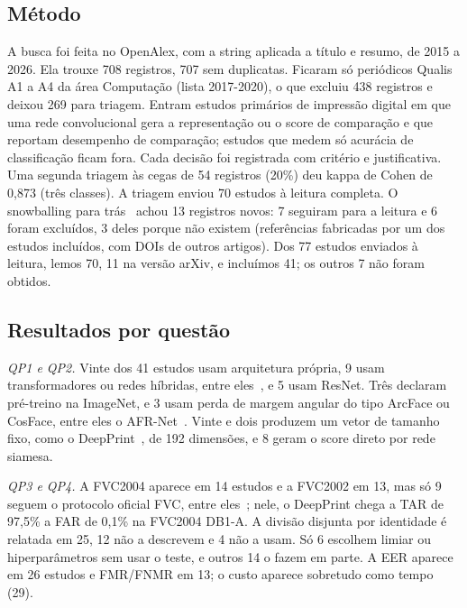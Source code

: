 \documentclass[conference]{IEEEtran}
\newcommand{\mapRegistros}{708}
\newcommand{\mapUnicos}{707}
\newcommand{\mapQualis}{438}
\newcommand{\mapTriagem}{269}
\newcommand{\mapTexto}{70}
\newcommand{\mapLidos}{70}
\newcommand{\mapIncl}{41}
\newcommand{\mapPend}{7}
\begin{document}
\subsection{Método}

A busca foi feita no OpenAlex, com a string aplicada a título e resumo, de 2015 a 2026. Ela trouxe \mapRegistros{} registros, \mapUnicos{} sem duplicatas. Ficaram só periódicos Qualis A1 a A4 da área Computação (lista 2017-2020), o que excluiu \mapQualis{} registros e deixou \mapTriagem{} para triagem. Entram estudos primários de impressão digital em que uma rede convolucional gera a representação ou o score de comparação e que reportam desempenho de comparação; estudos que medem só acurácia de classificação ficam fora. Cada decisão foi registrada com critério e justificativa. Uma segunda triagem às cegas de 54 registros (20\%) deu kappa de Cohen de 0,873 (três classes). A triagem enviou \mapTexto{} estudos à leitura completa. O snowballing para trás~\cite{wohlin2014snowballing} achou 13 registros novos: 7 seguiram para a leitura e 6 foram excluídos, 3 deles porque não existem (referências fabricadas por um dos estudos incluídos, com DOIs de outros artigos). Dos 77 estudos enviados à leitura, lemos \mapLidos{}, 11 na versão arXiv, e incluímos \mapIncl{}; os outros \mapPend{} não foram obtidos.

\subsection{Resultados por questão}

\emph{QP1 e QP2.} Vinte dos \mapIncl{} estudos usam arquitetura própria, 9 usam transformadores ou redes híbridas, entre eles~\cite{qiu2024ifvit,grosz2024afrnet,guan2024jipnet}, e 5 usam ResNet. Três declaram pré-treino na ImageNet, e 3 usam perda de margem angular do tipo ArcFace ou CosFace, entre eles o AFR-Net~\cite{grosz2024afrnet}. Vinte e dois produzem um vetor de tamanho fixo, como o DeepPrint~\cite{engelsma2021deepprint}, de 192 dimensões, e 8 geram o score direto por rede siamesa.

\emph{QP3 e QP4.} A FVC2004 aparece em 14 estudos e a FVC2002 em 13, mas só 9 seguem o protocolo oficial FVC, entre eles~\cite{engelsma2021deepprint,qiu2024ifvit,grosz2024afrnet}; nele, o DeepPrint chega a TAR de 97,5\% a FAR de 0,1\% na FVC2004 DB1-A. A divisão disjunta por identidade é relatada em 25, 12 não a descrevem e 4 não a usam. Só 6 escolhem limiar ou hiperparâmetros sem usar o teste, e outros 14 o fazem em parte. A EER aparece em 26 estudos e FMR/FNMR em 13; o custo aparece sobretudo como tempo (29).
\end{document}
